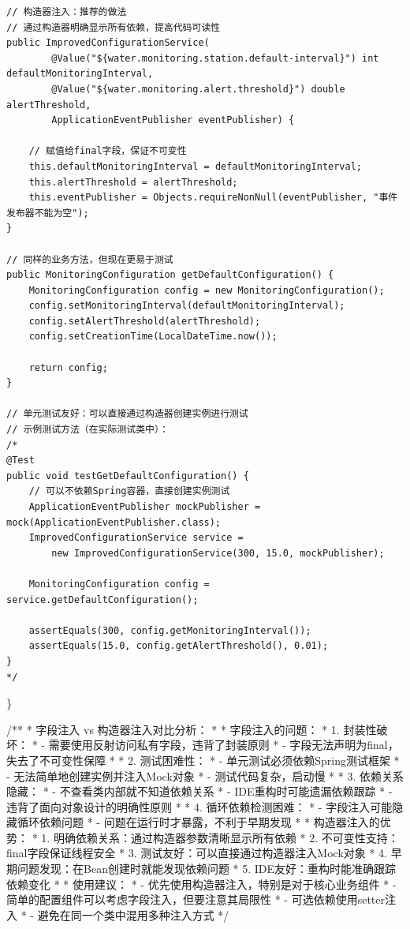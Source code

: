 \begin{verbatim}
// 构造器注入：推荐的做法
// 通过构造器明确显示所有依赖，提高代码可读性
public ImprovedConfigurationService(
        @Value("${water.monitoring.station.default-interval}") int defaultMonitoringInterval,
        @Value("${water.monitoring.alert.threshold}") double alertThreshold,
        ApplicationEventPublisher eventPublisher) {
    
    // 赋值给final字段，保证不可变性
    this.defaultMonitoringInterval = defaultMonitoringInterval;
    this.alertThreshold = alertThreshold;
    this.eventPublisher = Objects.requireNonNull(eventPublisher, "事件发布器不能为空");
}

// 同样的业务方法，但现在更易于测试
public MonitoringConfiguration getDefaultConfiguration() {
    MonitoringConfiguration config = new MonitoringConfiguration();
    config.setMonitoringInterval(defaultMonitoringInterval);
    config.setAlertThreshold(alertThreshold);
    config.setCreationTime(LocalDateTime.now());
    
    return config;
}

// 单元测试友好：可以直接通过构造器创建实例进行测试
// 示例测试方法（在实际测试类中）：
/*
@Test
public void testGetDefaultConfiguration() {
    // 可以不依赖Spring容器，直接创建实例测试
    ApplicationEventPublisher mockPublisher = mock(ApplicationEventPublisher.class);
    ImprovedConfigurationService service = 
        new ImprovedConfigurationService(300, 15.0, mockPublisher);
    
    MonitoringConfiguration config = service.getDefaultConfiguration();
    
    assertEquals(300, config.getMonitoringInterval());
    assertEquals(15.0, config.getAlertThreshold(), 0.01);
}
*/
\end{verbatim}

\}

/** * 字段注入 vs 构造器注入对比分析： * * 字段注入的问题： * 1. 封装性破坏： * - 需要使用反射访问私有字段，违背了封装原则 * - 字段无法声明为final，失去了不可变性保障 * * 2. 测试困难性： * - 单元测试必须依赖Spring测试框架 * - 无法简单地创建实例并注入Mock对象 * - 测试代码复杂，启动慢 * * 3. 依赖关系隐藏： * - 不查看类内部就不知道依赖关系 * - IDE重构时可能遗漏依赖跟踪 * - 违背了面向对象设计的明确性原则 * * 4. 循环依赖检测困难： * - 字段注入可能隐藏循环依赖问题 * - 问题在运行时才暴露，不利于早期发现 * * 构造器注入的优势： * 1. 明确依赖关系：通过构造器参数清晰显示所有依赖 * 2. 不可变性支持：final字段保证线程安全 * 3. 测试友好：可以直接通过构造器注入Mock对象 * 4. 早期问题发现：在Bean创建时就能发现依赖问题 * 5. IDE友好：重构时能准确跟踪依赖变化 * * 使用建议： * - 优先使用构造器注入，特别是对于核心业务组件 * - 简单的配置组件可以考虑字段注入，但要注意其局限性 * - 可选依赖使用setter注入 * - 避免在同一个类中混用多种注入方式 */

